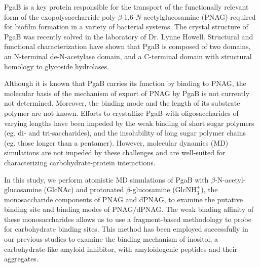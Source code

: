 PgaB is a key protein responsible for the transport of the functionally relevant form of the exopolysaccharride poly-$\beta$-1,6-$N$-acetylglucosamine (PNAG) required for biofilm formation in a variety of bacterial systems.\cite{Little:2012dp} The crystal structure of PgaB was recently solved in the laboratory of Dr. Lynne Howell.\cite{Little:2012dp} Structural and functional characterization have shown that PgaB is composed of two domains, an N-terminal de-N-acetylase domain, and a C-terminal domain with structural homology to glycoside hydrolases.\cite{Little:2012dp}

Although it is known that PgaB carries its function by binding to PNAG, the molecular basis of the mechanism of export of PNAG by PgaB is not currently not determined.  Moreover, the binding mode and the length of its substrate polymer are not known.
Efforts to crystallize PgaB with oligosaccharides of varying lengths have been impeded by the weak binding of short sugar polymers (eg. di- and tri-saccharides), and the insolubility of long sugar polymer chains (eg. those longer than a pentamer). However, molecular dynamics (MD) simulations are not impeded by these challenges and are well-suited for characterizing carbohydrate-protein interactions.\cite{Fadda:2010p5889}

In this study, we perform atomistic MD simulations of PgaB with $\beta$-N-acetyl-glucosamine (GlcNAc) and protonated $\beta$-glucosamine (GlcNH$_{3}^{+}$), the monosaccharide components of PNAG and dPNAG, to examine the putative binding site and binding modes of PNAG/dPNAG.  The weak binding affinity of these monosaccharides allows us to use a fragment-based methodology to probe for carbohydrate binding sites.  This method has been employed successfully in our previous studies to examine the binding mechanism of inositol, a carbohydrate-like amyloid inhibitor, with amyloidogenic peptides and their aggregates.\cite{Li:2012bx}

